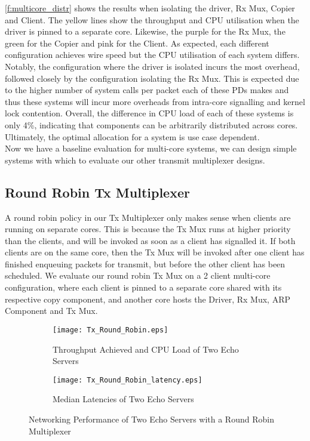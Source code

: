 \autoref{f:multicore_distr} shows the results when isolating the driver, Rx Mux, Copier and Client. The yellow lines show the throughput
and CPU utilisation when the driver is pinned to a separate core. Likewise, the purple for the Rx Mux, the green for the Copier and pink for
the Client. As expected, each different configuration achieves wire speed but the CPU utilisation of each system differs. Notably, 
the configuration where the driver is isolated incurs the most overhead, followed closely by the configuration isolating the Rx Mux. This is 
expected due to the higher number of system calls per packet each of these PDs makes and thus these systems will incur more overheads from
intra-core signalling and kernel lock contention. Overall, the difference in CPU load of each of these systems is only 4\%, indicating that
components can be arbitrarily distributed across cores. Ultimately, the optimal allocation for a system is use case dependent.\\
Now we have a baseline evaluation for multi-core systems, we can design simple systems with which to evaluate our other transmit multiplexer
designs. 

\subsection{Round Robin Tx Multiplexer}

A round robin policy in our Tx Multiplexer only makes sense when clients are running on separate cores. This is because the Tx Mux runs at higher
priority than the clients, and will be invoked as soon as a client has signalled it. If both clients are on the same core, then the Tx Mux will
be invoked after one client has finished enqueuing packets for transmit, but before the other client has been scheduled. We evaluate our round robin
Tx Mux on a 2 client multi-core configuration, where each client is pinned to a separate core shared with its respective copy component, and another
core hosts the Driver, Rx Mux, ARP Component and Tx Mux. 

\noindent\begin{figure}[H]
    \centering
	\begin{multicols}{2}
		\begin{subfigure}[b]{0.45\textwidth}
        \centering
        \texttt{[image: Tx\_Round\_Robin.eps]}
        \caption{Throughput Achieved and CPU Load of Two Echo Servers}
        \label{f:round_robin_mux}
    \end{subfigure}\qquad
    \begin{subfigure}[b]{0.45\textwidth}
        \vspace{52pt}
        \centering
        \texttt{[image: Tx\_Round\_Robin\_latency.eps]}
        \vspace{0.5pt}
        \caption{Median Latencies of Two Echo Servers}
        \label{f:round_robin_mux_latency}
    \end{subfigure}
\end{multicols}
\caption{Networking Performance of Two Echo Servers with a Round Robin Multiplexer}
\end{figure}

